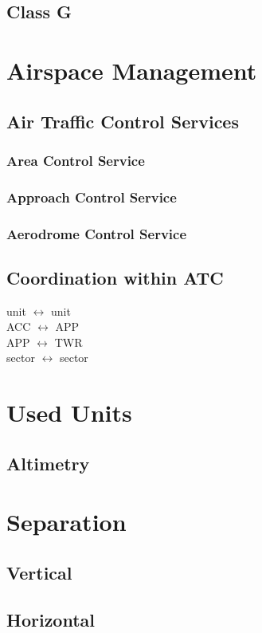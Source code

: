 \subsection{Class G}

\section{Airspace Management}
\subsection{Air Traffic Control Services}
\subsubsection{Area Control Service}
\subsubsection{Approach Control Service}
\subsubsection{Aerodrome Control Service}
\subsection{Coordination within ATC}
unit $\leftrightarrow$ unit \\
ACC $\leftrightarrow$ APP \\
APP $\leftrightarrow$ TWR \\
sector $\leftrightarrow$ sector

\section{Used Units}
\subsection{Altimetry}

\section{Separation}
\subsection{Vertical}
\subsection{Horizontal}
